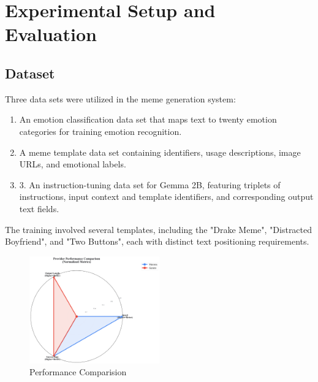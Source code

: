 \documentclass[conference]{IEEEtran}
\begin{document}
% 

\section{Experimental Setup and Evaluation}
\subsection{Dataset}
Three data sets were utilized in the meme generation system:
\begin{enumerate}
    \item An emotion classification data set that maps text to twenty emotion categories for training emotion recognition.
    \item A meme template data set containing identifiers, usage descriptions, image URLs, and emotional labels.
    \item 3.	An instruction-tuning data set for Gemma 2B, featuring triplets of instructions, input context and template identifiers, and corresponding output text fields.
\end{enumerate}

The training involved several templates, including the "Drake Meme", "Distracted Boyfriend", and "Two Buttons", each with distinct text positioning requirements.

\begin{figure}[H]
\centering
\includegraphics[width=0.5\textwidth]{Assets/graphs/radar_comparison.png}
\caption{Performance Comparision}
\label{fig:performance-comparison}
\end{figure}
\end{document}
